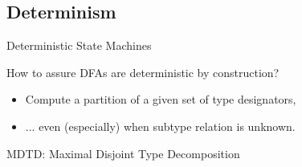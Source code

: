 \subsection{Determinism}

{  %
\begin{frame}{ Deterministic State Machines}

  How to assure DFAs are deterministic by construction?

  \begin{itemize}
  \item   Compute a partition of a given set of type designators,
  \item   ... even (especially) when subtype relation is unknown.
  \end{itemize}

\end{frame}
}


  


\begin{frame}{MDTD: Maximal Disjoint Type Decomposition}
  \begin{columns}
    \begin{column}{0.5\textwidth}
    \end{column}
    \begin{column}{0.5\textwidth}
    \end{column}
  \end{columns}
\end{frame}

